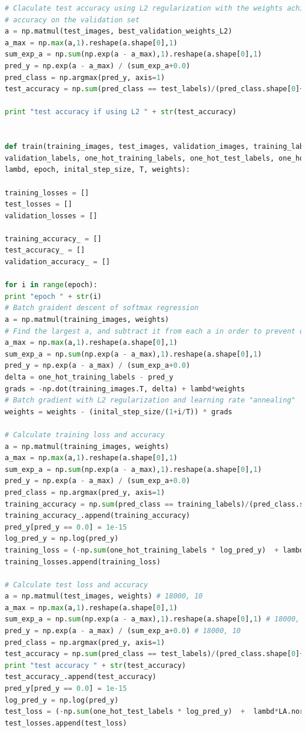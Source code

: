 \documentclass{article} %
\begin{document}
{\begin{lstlisting}[language=Python]
# Claculate test accuracy using L2 regularization with the weights achieve highest 
# accuracy on the validation set
a = np.matmul(test_images, best_validation_weights_L2) 
a_max = np.max(a,1).reshape(a.shape[0],1)
sum_exp_a = np.sum(np.exp(a - a_max),1).reshape(a.shape[0],1) 
pred_y = np.exp(a - a_max) / (sum_exp_a+0.0) 
pred_class = np.argmax(pred_y, axis=1)
test_accuracy = np.sum(pred_class == test_labels)/(pred_class.shape[0]+0.0)

print "test accuracy if using L2 " + str(test_accuracy) 


def train(training_images, test_images, validation_images, training_labels, test_labels, \
validation_labels, one_hot_training_labels, one_hot_test_labels, one_hot_validation_labels, \
lambd, epoch, inital_step_size, T, weights):

training_losses = []
test_losses = []
validation_losses = []

training_accuracy_ = []
test_accuracy_ = []
validation_accuracy_ = []

for i in range(epoch):
print "epoch " + str(i)
# Batch graident descent of softmax regression
a = np.matmul(training_images, weights) 
# Find the largest a, and subtract it from each a in order to prevent overflow
a_max = np.max(a,1).reshape(a.shape[0],1)
sum_exp_a = np.sum(np.exp(a - a_max),1).reshape(a.shape[0],1) 
pred_y = np.exp(a - a_max) / (sum_exp_a+0.0) 
delta = one_hot_training_labels - pred_y 
grads = -np.dot(training_images.T, delta) + lambd*weights
# Batch gradient with L2 regularization and learning rate "annealing"
weights = weights - (inital_step_size/(1+i/T)) * grads

# Calculate training loss and accuracy
a = np.matmul(training_images, weights) 
a_max = np.max(a,1).reshape(a.shape[0],1)
sum_exp_a = np.sum(np.exp(a - a_max),1).reshape(a.shape[0],1) 
pred_y = np.exp(a - a_max) / (sum_exp_a+0.0) 
pred_class = np.argmax(pred_y, axis=1)
training_accuracy = np.sum(pred_class == training_labels)/(pred_class.shape[0]+0.0)
training_accuracy_.append(training_accuracy)
pred_y[pred_y == 0.0] = 1e-15
log_pred_y = np.log(pred_y)
training_loss = (-np.sum(one_hot_training_labels * log_pred_y)  + lambd*LA.norm(weights)**2) / training_images.shape[0]
training_losses.append(training_loss)

# Calculate test loss and accuracy
a = np.matmul(test_images, weights) # 18000, 10
a_max = np.max(a,1).reshape(a.shape[0],1)
sum_exp_a = np.sum(np.exp(a - a_max),1).reshape(a.shape[0],1) # 18000, 1
pred_y = np.exp(a - a_max) / (sum_exp_a+0.0) # 18000, 10
pred_class = np.argmax(pred_y, axis=1)
test_accuracy = np.sum(pred_class == test_labels)/(pred_class.shape[0]+0.0)
print "test accuracy " + str(test_accuracy)
test_accuracy_.append(test_accuracy)
pred_y[pred_y == 0.0] = 1e-15
log_pred_y = np.log(pred_y)
test_loss = (-np.sum(one_hot_test_labels * log_pred_y)  +  lambd*LA.norm(weights)**2) / test_images.shape[0]
test_losses.append(test_loss)


\end{lstlisting}}
\end{document}

